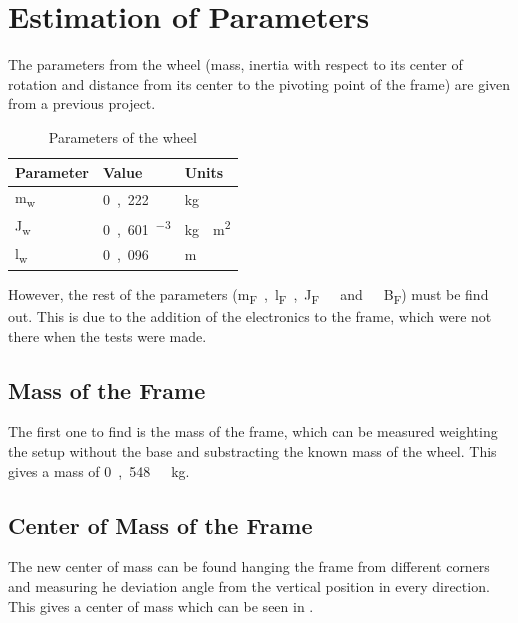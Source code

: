 \section{Estimation of Parameters}
The parameters from the wheel (mass, inertia with respect to its center of rotation and distance from its center to the pivoting point of the frame) are given from a previous project.

\begin{table}[H]
	\begin{tabular}{|l|l|p{2cm}|}
		\hline %
		\textbf{Parameter} &\textbf{Value} &\textbf{Units}\\
		\hline %
		\si{m_w}         & \si{0,222}       &kg\\
		\hline %
		\si{J_w}            & \si{0,601 \cdot 10^{-3}}	&\si{kg \cdot m^2}\\
		\hline %
		\si{l_w}         & \si{0,096}       &m\\
		\hline 
	\end{tabular}
	\caption{Parameters of the wheel}
	\label{ParametersWheel}
\end{table}

However, the rest of the parameters (\si{m_F, l_F, J_F\ and\ B_F}) must be find out. This is due to the addition of the electronics to the frame, which were not there when the tests were made.

\subsection{Mass of the Frame}
The first one to find is the mass of the frame, which can be measured weighting the setup without the base and substracting the known mass of the wheel. This gives a mass of \si{0,548\ kg}.

\subsection{Center of Mass of the Frame}
The new center of mass can be found hanging the frame from different corners and measuring he deviation angle from the vertical position in every direction. This gives a center of mass which can be seen in \figref{}. 

